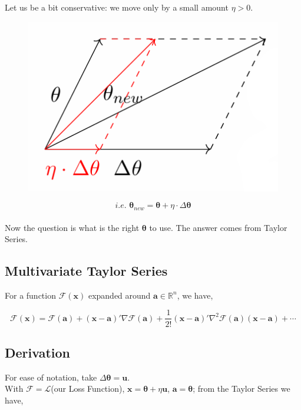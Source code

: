 \documentclass[11pt, a4paper]{article}
\begin{document}
Let us be a bit conservative: we move only by a small amount $\eta > 0$.

\begin{figure}[!htbp]
\centering
\includegraphics[scale=0.7]{image_2}
\end{figure}

$$i.e. \,\, \boldsymbol{\theta}_{new} = \boldsymbol{\theta} + \eta \cdot \Delta\boldsymbol{\theta}$$ \\[0.5em]

Now the question is what is the right $\boldsymbol{\theta}$ to use. The answer comes from Taylor Series.

\newpage

\subsection{Multivariate Taylor Series}

For a function $\mathcal{F}(\mathbf{x})$ expanded around $\mathbf{a} \in \mathbb{R}^n$, we have,

$$
\mathcal{F}(\mathbf{x}) = \mathcal{F}(\mathbf{a}) + (\mathbf{x} - \mathbf{a})' \nabla \mathcal{F}(\mathbf{a}) + \dfrac{1}{2!} (\mathbf{x} - \mathbf{a})' \nabla^2 \mathcal{F}(\mathbf{a}) (\mathbf{x} - \mathbf{a}) + \cdots
$$

\subsection{Derivation}

For ease of notation, take $\Delta \boldsymbol{\theta} = \boldsymbol{u}$. \\


With $\mathcal{F} = \mathscr{L}$(our Loss Function), $\mathbf{x} = \boldsymbol{\theta} + \eta \boldsymbol{u}$, $\mathbf{a} = \boldsymbol{\theta}$; from the Taylor Series we have,
\end{document}
